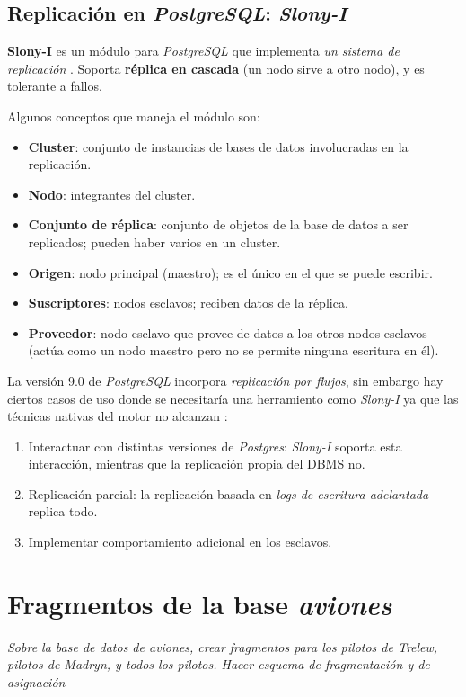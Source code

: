 \subsection{Replicación en \emph{PostgreSQL}: \emph{Slony-I}}
\textbf{Slony-I} es un módulo para \emph{PostgreSQL} que implementa \emph{un sistema de replicación } \autocite{slony}. Soporta \textbf{réplica en cascada} (un nodo sirve a otro nodo), y es tolerante a fallos. 

Algunos conceptos que maneja el módulo son:
\begin{itemize}
    \item \textbf{Cluster}: conjunto de instancias de bases de datos involucradas en la replicación.
    \item \textbf{Nodo}: integrantes del cluster.
    \item \textbf{Conjunto de réplica}: conjunto de objetos de la base de datos a ser replicados; pueden haber varios en un cluster.
    \item \textbf{Origen}: nodo principal (maestro); es el único en el que se puede escribir.
    \item \textbf{Suscriptores}: nodos esclavos; reciben datos de la réplica.
    \item \textbf{Proveedor}: nodo esclavo que provee de datos a los otros nodos esclavos (actúa como un nodo maestro pero no se permite ninguna escritura en él).
\end{itemize}

La versión 9.0 de \emph{PostgreSQL} incorpora \emph{replicación por flujos}, sin embargo hay ciertos casos de uso donde se necesitaría una herramiento como \emph{Slony-I} ya que las técnicas nativas del motor no alcanzan \autocite{infoslony}:
\begin{enumerate}
    \item Interactuar con distintas versiones de \emph{Postgres}: \emph{Slony-I} soporta esta interacción, mientras que la replicación propia del DBMS no.
    \item Replicación parcial: la replicación basada en \emph{logs de escritura adelantada} replica todo. 
    \item Implementar comportamiento adicional en los esclavos.
\end{enumerate}


\section{Fragmentos de la base \emph{aviones}}
\emph{Sobre la base de datos de aviones, crear fragmentos para los pilotos de Trelew, pilotos de Madryn, y todos los pilotos. Hacer esquema de fragmentación y de asignación} 


